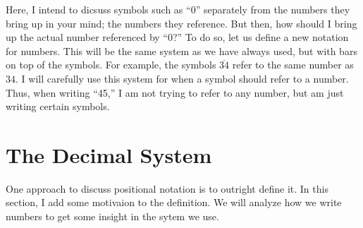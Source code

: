 \documentclass{article}
\begin{document}
	Here, I intend to dicsuss symbols such as ``0'' separately from the numbers they bring up in your mind; the numbers they reference. But then, how should I bring up the actual number referenced by ``0?'' To do so, let us define a new notation for numbers. This will be the same system as we have always used, but with bars on top of the symbols. For example, the symbols $\overline{34}$ refer to the same number as $34$. I will carefully use this system for when a symbol should refer to a number. Thus, when writing ``45,'' I am not trying to refer to any number, but am just writing certain symbols.
	
	\section{The Decimal System}
	One approach to discuss positional notation is to outright define it. In this section, I add some motivaion to the definition. We will analyze how we write numbers to get some insight in the sytem we use.
	
	
	 
\end{document}
